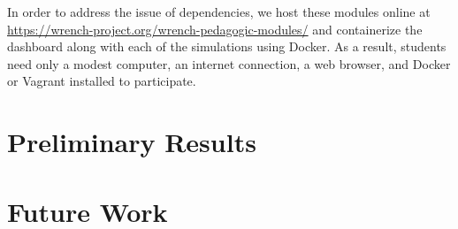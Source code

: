 \documentclass{article}
\begin{document}
In order to address the issue of dependencies, we host these modules online at
\underline{https://wrench-project.org/wrench-pedagogic-modules/} and containerize the dashboard
along with each of the simulations using Docker. As a result, students need only a modest computer, an internet
connection, a web browser, and Docker or Vagrant installed to participate. 

\section{Preliminary Results}

\section{Future Work}



\end{document}

